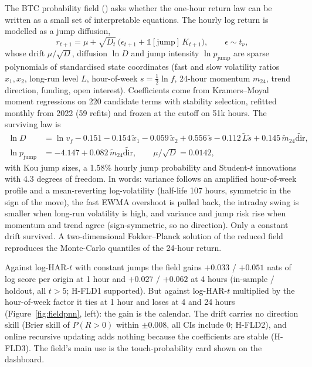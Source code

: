 \documentclass[10pt,a4paper]{article}
\newcommand{\hyp}[1]{\textsf{#1}}
\begin{document}
The BTC probability field (\protect{}) asks whether the one-hour return law can be written as a small set of interpretable equations. The hourly log return is modelled as a jump diffusion,
\begin{equation}
r_{t+1} = \mu + \sqrt{D_t}\,\bigl(\epsilon_{t+1} + \mathbb{1}[\text{jump}]\,K_{t+1}\bigr),\qquad \epsilon \sim t_\nu,
\end{equation}
whose drift $\mu/\sqrt{D}$, diffusion $\ln D$ and jump intensity $\ln p_{\text{jump}}$ are sparse polynomials of standardised state coordinates (fast and slow volatility ratios $x_1, x_2$, long-run level $L$, hour-of-week $s = \tfrac12 \ln f$, 24-hour momentum $m_{24}$, trend direction, funding, open interest). Coefficients come from Kramers--Moyal moment regressions on 220 candidate terms with stability selection, refitted monthly from 2022 (59 refits) and frozen at the cutoff on 51k hours. The surviving law is
\begin{align}
\ln D &= \ln v_f - 0.151 - 0.154\,\tilde x_1 - 0.059\,\tilde x_2 + 0.556\,\tilde s - 0.112\,\tilde L\tilde s + 0.145\,\tilde m_{24}\widetilde{\text{dir}},\\
\ln p_{\text{jump}} &= -4.147 + 0.082\,\tilde m_{24}\widetilde{\text{dir}}, \qquad \mu/\sqrt{D} = 0.0142,
\end{align}
with Kou jump sizes, a 1.58\% hourly jump probability and Student-$t$ innovations with 4.3 degrees of freedom. In words: variance follows an amplified hour-of-week profile and a mean-reverting log-volatility (half-life 107 hours, symmetric in the sign of the move), the fast EWMA overshoot is pulled back, the intraday swing is smaller when long-run volatility is high, and variance and jump risk rise when momentum and trend agree (sign-symmetric, so no direction). Only a constant drift survived. A two-dimensional Fokker--Planck solution of the reduced field reproduces the Monte-Carlo quantiles of the 24-hour return.

Against log-HAR-$t$ with constant jumps the field gains $+0.033$ / $+0.051$ nats of log score per origin at 1 hour and $+0.027$ / $+0.062$ at 4 hours (in-sample / holdout, all $t>5$; \hyp{H-FLD1} supported). But against log-HAR-$t$ multiplied by the hour-of-week factor it ties at 1 hour and loses at 4 and 24 hours (Figure~\ref{fig:fieldpnn}, left): the gain is the calendar. The drift carries no direction skill (Brier skill of $P(R>0)$ within $\pm 0.008$, all CIs include 0; \hyp{H-FLD2}), and online recursive updating adds nothing because the coefficients are stable (\hyp{H-FLD3}). The field's main use is the touch-probability card shown on the dashboard.
\end{document}
